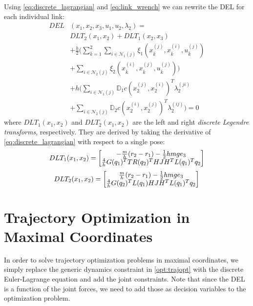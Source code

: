 \documentclass[conference]{IEEEtran}
\begin{document}
Using \eqref{eq:discrete_lagrangian} and \eqref{eq:link_wrench} we can rewrite the DEL for
each individual link:
\begin{equation}
\begin{aligned}
    DEL&(x_1, x_2, x_3, u_1, u_2, \lambda_2) = \\
    &DLT_2(x_1, x_2) + DLT_1(x_2, x_3) \\
    &+ \frac{h}{2} \Bigg( \sum_{\bar{k} = 1}^{2} 
        \sum_{i \in \mathcal{N}_1(j)} \xi_1\left(x_{\bar{k}}^{(j)}, x_{\bar{k}}^{(i)}, u_{\bar{k}}^{(j)}\right) \\
    & + \sum_{i \in \mathcal{N}_2(j)} \xi_2\left(x_{\bar{k}}^{(i)}, x_{\bar{k}}^{(j)}, u_{\bar{k}}^{(j)}\right)
    \Bigg) \\
    & + h \bigg( \sum_{i \in \mathcal{N}_1(j)} \mathbb{D}_1 c\left(x_2^{(j)}, x_2^{(i)}\right)^T \lambda_2^{(ji)} \\
    & +         \sum_{i \in \mathcal{N}_2(j)} \mathbb{D}_2 c\left(x_2^{(i)}, x_2^{(j)}\right)^T \lambda_2^{(ij)} \bigg) = 0
\end{aligned}
\end{equation}
where $DLT_1(x_1, x_2)$ and $DLT_2(x_1, x_2)$ are the left and right 
\textit{discrete Legendre transforms}, respectively. They are derived by taking the 
derivative of \eqref{eq:discrete_lagrangian} with respect to a single pose:
\begin{equation}
    DLT_1(x_1, x_2) = \begin{bmatrix}
        -\frac{m}{h} (r_2 - r_1) - \frac{1}{2} h m g e_3 \\
        \frac{4}{h} G(q_1)^T T R(q_2)^T H J H^T L(q_1)^T q_2
    \end{bmatrix}
\end{equation}
\begin{equation} \label{eq:DEL_single}
    DLT_2(x_1, x_2) = \begin{bmatrix}
        \frac{m}{h} (r_2 - r_1) - \half h m g e_3 \\
        \frac{4}{h} G(q_2)^T L(q_1) H J H^T L(q_1)^T q_2
    \end{bmatrix}
\end{equation}

\section{Trajectory Optimization in Maximal Coordinates}
In order to solve trajectory optimization problems in maximal coordinates, we simply 
replace the generic dynamics constraint in \eqref{opt:trajopt} with the discrete 
Euler-Lagrange equation and add the joint constraints. Note that since the DEL is a function
of the joint forces, we need to add those as decision variables to the optimization problem.
\end{document}

